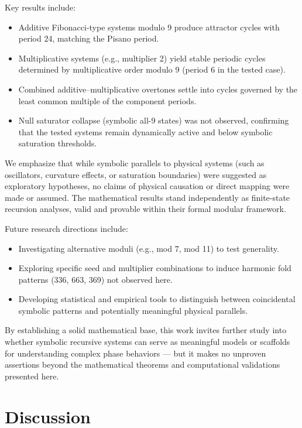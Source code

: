 \documentclass[12pt]{article}
\begin{document}
Key results include:
\begin{itemize}
    \item Additive Fibonacci-type systems modulo 9 produce attractor cycles with period 24, matching the Pisano period.
    \item Multiplicative systems (e.g., multiplier 2) yield stable periodic cycles determined by multiplicative order modulo 9 (period 6 in the tested case).
    \item Combined additive--multiplicative overtones settle into cycles governed by the least common multiple of the component periods.
    \item Null saturator collapse (symbolic all-9 states) was not observed, confirming that the tested systems remain dynamically active and below symbolic saturation thresholds.
\end{itemize}

We emphasize that while symbolic parallels to physical systems (such as oscillators, curvature effects, or saturation boundaries) were suggested as exploratory hypotheses, no claims of physical causation or direct mapping were made or assumed. The mathematical results stand independently as finite-state recursion analyses, valid and provable within their formal modular framework.

Future research directions include:
\begin{itemize}
    \item Investigating alternative moduli (e.g., mod 7, mod 11) to test generality.
    \item Exploring specific seed and multiplier combinations to induce harmonic fold patterns (336, 663, 369) not observed here.
    \item Developing statistical and empirical tools to distinguish between coincidental symbolic patterns and potentially meaningful physical parallels.
\end{itemize}

By establishing a solid mathematical base, this work invites further study into whether symbolic recursive systems can serve as meaningful models or scaffolds for understanding complex phase behaviors — but it makes no unproven assertions beyond the mathematical theorems and computational validations presented here.

\section{Discussion}
\end{document}
